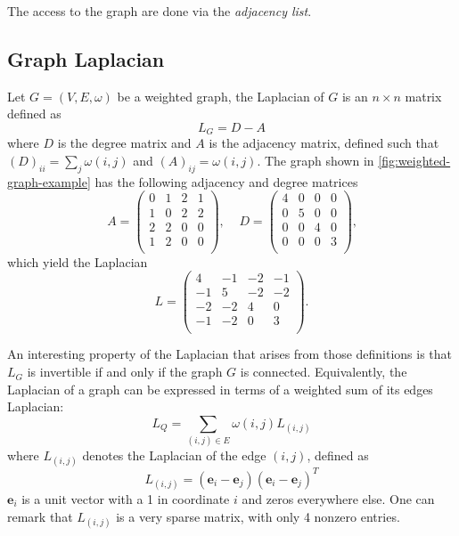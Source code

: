 The access to the graph are done via the \textit{adjacency list}.

\subsection{Graph Laplacian}
Let $G = (V, E, \omega)$ be a weighted graph, the Laplacian of $G$ is an $n
\times n$ matrix defined as
\begin{equation}
    L_G = D - A
\end{equation}
where $D$ is the degree matrix and $A$ is the adjacency matrix, defined
such that $(D)_{ii} = \sum_j \omega(i,j)$ and $(A)_{ij} = \omega(i,j)$. The
graph shown in \autoref{fig:weighted-graph-example} has the following adjacency
and degree matrices
\begin{equation*}
    A = \begin{pmatrix}
        0 & 1 & 2 & 1 \\
        1 & 0 & 2 & 2 \\
        2 & 2 & 0 & 0 \\
        1 & 2 & 0 & 0 \\
    \end{pmatrix} \text{,} \;
    \quad
    D = \begin{pmatrix}
        4 & 0 & 0 & 0 \\
        0 & 5 & 0 & 0 \\
        0 & 0 & 4 & 0 \\
        0 & 0 & 0 & 3 \\
    \end{pmatrix} \text{,}
\end{equation*}
which yield the Laplacian
\begin{equation*}
    L = \begin{pmatrix}
        4 & -1 & -2 & -1 \\
        -1 & 5 & -2 & -2 \\
        -2 & -2 & 4 & 0 \\
        -1 & -2 & 0 & 3 \\
    \end{pmatrix} \text{.}
\end{equation*}

An interesting property of the Laplacian that arises from those definitions is
that $L_G$ is invertible if and only if the graph $G$ is connected.
Equivalently, the Laplacian of a graph can be expressed in terms of a weighted
sum of its edges Laplacian:
\begin{equation}
    L_Q = \sum_{(i,j)\in E} \omega(i,j)L_{(i,j)}
\end{equation}
where $L_{(i,j)}$ denotes the Laplacian of the edge $(i,j)$, defined as
\begin{equation}
    L_{(i,j)} = (\boldsymbol e_i - \boldsymbol e_j)(\boldsymbol e_i - \boldsymbol e_j)^T
\end{equation}
$\boldsymbol e_i$ is a unit vector with a 1 in coordinate $i$ and zeros
everywhere else. One can remark that $L_{(i,j)}$ is a very sparse matrix, with
only 4 nonzero entries.

